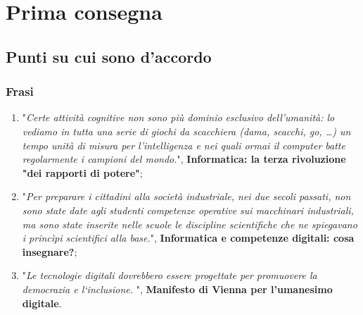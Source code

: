 \chapter{Prima consegna}

\section{Punti su cui sono d'accordo}
\subsection{Frasi}
\begin{enumerate}
    \item "\textit{Certe attività cognitive non sono più dominio esclusivo dell’umanità: lo vediamo in tutta una serie di giochi da scacchiera (dama, scacchi, go, …) un tempo unità di misura per l’intelligenza e nei quali ormai il computer batte regolarmente i campioni del mondo.}", \textbf{Informatica: la terza rivoluzione "dei rapporti di potere"};  
    \item "\textit{Per preparare i cittadini alla società industriale, nei due secoli passati, non sono state date agli studenti competenze operative sui macchinari industriali, ma sono state inserite nelle scuole le discipline scientifiche che ne spiegavano i princìpi scientifici alla base.}", \textbf{Informatica e competenze digitali: cosa insegnare?};
    \item "\textit{Le tecnologie digitali dovrebbero essere progettate per promuovere la democrazia
e l‘inclusione. }", \textbf{Manifesto di Vienna per l'umanesimo digitale}.
\end{enumerate}

